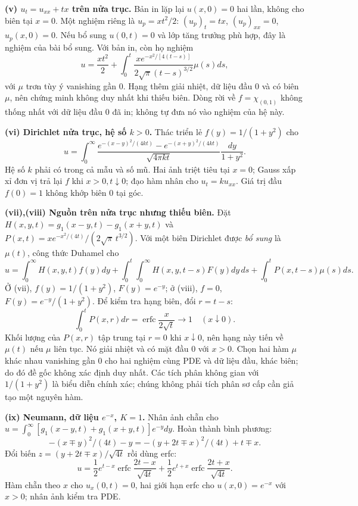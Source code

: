 \textbf{(v) $u_t=u_{xx}+tx$ trên nửa trục.}
Bản in lặp lại $u(x,0)=0$ hai lần, không cho biên tại $x=0$. Một nghiệm riêng là $u_p=xt^2/2$: $(u_p)_t=tx$, $(u_p)_{xx}=0$, $u_p(x,0)=0$. Nếu bổ sung $u(0,t)=0$ và lớp tăng trưởng phù hợp, đây là nghiệm của bài bổ sung. Với bản in, còn họ nghiệm
\[u=\frac{xt^2}2+\int_0^t
\frac{x e^{-x^2/[4(t-s)]}}{2\sqrt\pi(t-s)^{3/2}}\mu(s)ds,\]
với $\mu$ trơn tùy ý vanishing gần $0$. Hạng thêm giải nhiệt, dữ liệu đầu $0$ và có biên $\mu$, nên chứng minh không duy nhất khi thiếu biên. Dòng rời về $f=\chi_{(0,1)}$ không thống nhất với dữ liệu đầu $0$ đã in; không tự đưa nó vào nghiệm của hệ này.

\textbf{(vi) Dirichlet nửa trục, hệ số $k>0$.}
Thác triển lẻ $f(y)=1/(1+y^2)$ cho
\[u=\int_0^\infty
\frac{e^{-(x-y)^2/(4kt)}-e^{-(x+y)^2/(4kt)}}{\sqrt{4\pi kt}}
\frac{dy}{1+y^2}.\]
Hệ số $k$ phải có trong cả mẫu và số mũ. Hai ảnh triệt tiêu tại $x=0$; Gauss xấp xỉ đơn vị trả lại $f$ khi $x>0,t\downarrow0$; đạo hàm nhân cho $u_t=ku_{xx}$. Giá trị đầu $f(0)=1$ không khớp biên $0$ tại góc.

\textbf{(vii),(viii) Nguồn trên nửa trục nhưng thiếu biên.}
Đặt $H(x,y,t)=g_1(x-y,t)-g_1(x+y,t)$ và $P(x,t)=xe^{-x^2/(4t)}/(2\sqrt\pi\,t^{3/2})$. Với một biên Dirichlet được \emph{bổ sung} là $\mu(t)$, công thức Duhamel cho
\[u=\int_0^\infty H(x,y,t)f(y)dy+
\int_0^t\!\int_0^\infty H(x,y,t-s)F(y)dy\,ds+
\int_0^tP(x,t-s)\mu(s)ds.\]
Ở (vii), $f(y)=1/(1+y^2)$, $F(y)=e^{-y}$; ở (viii), $f=0$, $F(y)=e^{-y}/(1+y^2)$. Để kiểm tra hạng biên, đổi $r=t-s$:
\[\int_0^tP(x,r)dr=\operatorname{erfc}\frac{x}{2\sqrt t}\longrightarrow1
\quad(x\downarrow0).\]
Khối lượng của $P(x,r)$ tập trung tại $r=0$ khi $x\downarrow0$, nên hạng này tiến về $\mu(t)$ nếu $\mu$ liên tục. Nó giải nhiệt và có mặt đầu $0$ với $x>0$. Chọn hai hàm $\mu$ khác nhau vanishing gần $0$ cho hai nghiệm cùng PDE và dữ liệu đầu, khác biên; do đó đề gốc không xác định duy nhất. Các tích phân không gian với $1/(1+y^2)$ là biểu diễn chính xác; chúng không phải tích phân sơ cấp cần giả tạo một nguyên hàm.

\textbf{(ix) Neumann, dữ liệu $e^{-x}$, $K=1$.}
Nhân ảnh chẵn cho $u=\int_0^\infty[g_1(x-y,t)+g_1(x+y,t)]e^{-y}dy$. Hoàn thành bình phương:
\[-(x\mp y)^2/(4t)-y=-(y+2t\mp x)^2/(4t)+t\mp x.\]
Đổi biến $z=(y+2t\mp x)/\sqrt{4t}$ rồi dùng erfc:
\[u=\frac12e^{t-x}\operatorname{erfc}\frac{2t-x}{\sqrt{4t}}
+\frac12e^{t+x}\operatorname{erfc}\frac{2t+x}{\sqrt{4t}}.\]
Hàm chẵn theo $x$ cho $u_x(0,t)=0$, hai giới hạn erfc cho $u(x,0)=e^{-x}$ với $x>0$; nhân ảnh kiểm tra PDE.

